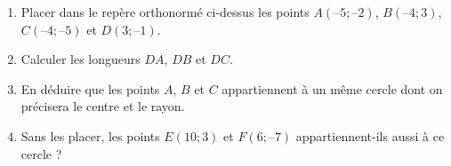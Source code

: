 \documentclass[
	classe=$2^{de}$,
	headerTitle=Activité,
	landscape,
	twocolumn
]{exercice}
\begin{document}
\begin{center}
\end{center}

\begin{enumerate}
	\item Placer dans le repère orthonormé ci-dessus les points $A(–5 ; –2)$, $B(–4 ; 3)$, $C(–4 ; –5)$ et $D(3 ; –1)$.
	\item Calculer les longueurs $DA$, $DB$ et $DC$. 
	\item En déduire que les points $A$, $B$ et $C$ appartiennent à un même cercle dont on précisera le centre et le rayon. 
	\item Sans les placer, les points $E(10 ; 3)$ et $F(6 ; –7)$ appartiennent-ils aussi à ce cercle ? 
\end{enumerate}
\end{document}
